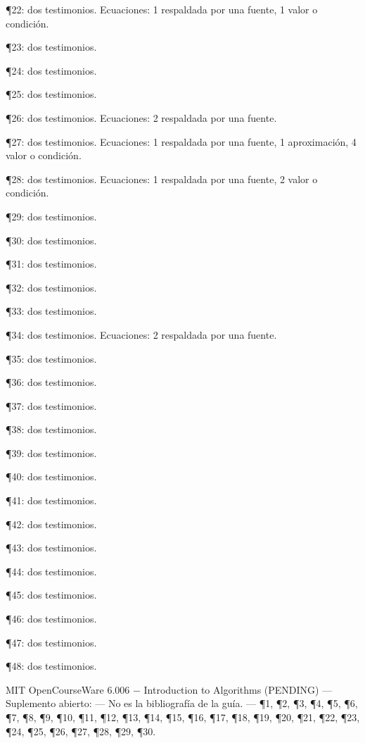\documentclass{book}
\begin{document}
\noindent ¶22: dos testimonios. Ecuaciones: 1 respaldada por una fuente, 1 valor o condición.

\noindent ¶23: dos testimonios.

\noindent ¶24: dos testimonios.

\noindent ¶25: dos testimonios.

\noindent ¶26: dos testimonios. Ecuaciones: 2 respaldada por una fuente.

\noindent ¶27: dos testimonios. Ecuaciones: 1 respaldada por una fuente, 1 aproximación, 4 valor o condición.

\noindent ¶28: dos testimonios. Ecuaciones: 1 respaldada por una fuente, 2 valor o condición.

\noindent ¶29: dos testimonios.

\noindent ¶30: dos testimonios.

\noindent ¶31: dos testimonios.

\noindent ¶32: dos testimonios.

\noindent ¶33: dos testimonios.

\noindent ¶34: dos testimonios. Ecuaciones: 2 respaldada por una fuente.

\noindent ¶35: dos testimonios.

\noindent ¶36: dos testimonios.

\noindent ¶37: dos testimonios.

\noindent ¶38: dos testimonios.

\noindent ¶39: dos testimonios.

\noindent ¶40: dos testimonios.

\noindent ¶41: dos testimonios.

\noindent ¶42: dos testimonios.

\noindent ¶43: dos testimonios.

\noindent ¶44: dos testimonios.

\noindent ¶45: dos testimonios.

\noindent ¶46: dos testimonios.

\noindent ¶47: dos testimonios.

\noindent ¶48: dos testimonios.

\medskip

\noindent MIT OpenCourseWare 6.006 \(-\) Introduction to Algorithms (PENDING) --- Suplemento abierto: --- No es la bibliografía de la guía. --- \P1, \P2, \P3, \P4, \P5, \P6, \P7, \P8, \P9, \P10, \P11, \P12, \P13, \P14, \P15, \P16, \P17, \P18, \P19, \P20, \P21, \P22, \P23, \P24, \P25, \P26, \P27, \P28, \P29, \P30.
\end{document}
